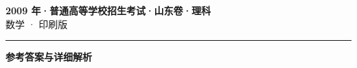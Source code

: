 \documentclass[zihao=5, a4paper]{ctexart}
\begin{document}
\begin{center}
  {\Large\bfseries 2009 年·普通高等学校招生考试·山东卷·理科}\\[4pt]
  {\large 数学 · 印刷版}
\end{center}
\medskip
{}

\par\bigskip\hrule\bigskip
{}
\begin{center}{\large\bfseries 参考答案与详细解析}\end{center}
\smallskip

\end{document}
